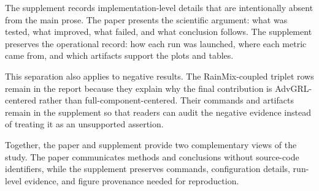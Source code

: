 \documentclass[
  11pt,
]{article}
\begin{document}
The supplement records implementation-level details that are
intentionally absent from the main prose. The paper presents the
scientific argument: what was tested, what improved, what failed, and
what conclusion follows. The supplement preserves the operational
record: how each run was launched, where each metric came from, and
which artifacts support the plots and tables.

This separation also applies to negative results. The RainMix-coupled
triplet rows remain in the report because they explain why the final
contribution is AdvGRL-centered rather than full-component-centered.
Their commands and artifacts remain in the supplement so that readers
can audit the negative evidence instead of treating it as an unsupported
assertion.

Together, the paper and supplement provide two complementary views of
the study. The paper communicates methods and conclusions without
source-code identifiers, while the supplement preserves commands,
configuration details, run-level evidence, and figure provenance needed
for reproduction.
\end{document}
